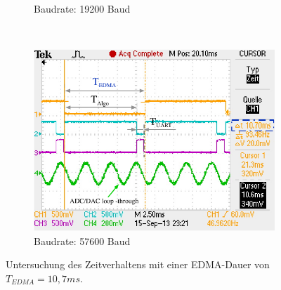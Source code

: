 \begin{figure}
\begin{subfigure}[b]{0.6\textwidth}
                \caption{Baudrate: 19200 Baud}
                \label{fig:Profile_UART_19200}
        \end{subfigure}
        ~ %
        \begin{subfigure}[b]{0.6\textwidth}
                \centering
                \includegraphics[width=\textwidth]{grafiken/04_Echtzeitversuch/Profile_UART_57600}
                \caption{Baudrate: 57600 Baud}
                \label{fig:Profile_UART_57600}
        \end{subfigure}
        \caption{Untersuchung des Zeitverhaltens mit einer EDMA-Dauer von $T_{EDMA} = 10,7ms$.}
        \label{fig:profiling}
\end{figure}












